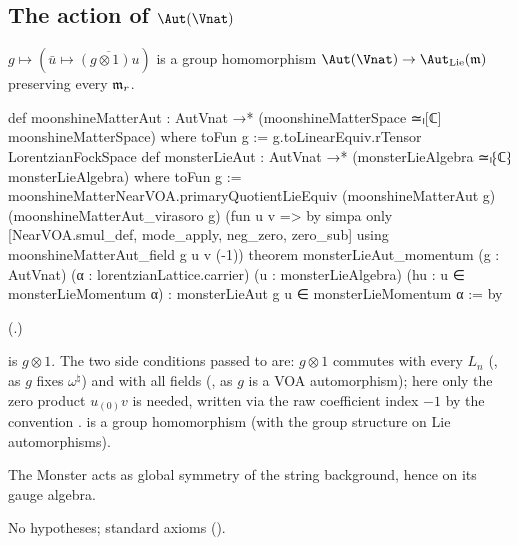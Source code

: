 \subsection{\texorpdfstring{The action of $\Aut(\Vnat)$}{The action of Aut(V-natural)}}

\begin{theorem}\label{ch18:thm:autaction}
$g\mapsto(\bar u\mapsto\overline{(g\otimes1)u})$ is a group homomorphism $\Aut(\Vnat)\to\Aut_{\mathrm{Lie}}(\chXVIIIm)$ preserving
every $\mathfrak{m}_r$.
\end{theorem}
\begin{leancode}
def moonshineMatterAut : AutVnat →* (moonshineMatterSpace ≃ₗ[ℂ] moonshineMatterSpace) where
  toFun g := g.toLinearEquiv.rTensor LorentzianFockSpace
def monsterLieAut : AutVnat →* (monsterLieAlgebra ≃ₗ⁅ℂ⁆ monsterLieAlgebra) where
  toFun g := moonshineMatterNearVOA.primaryQuotientLieEquiv (moonshineMatterAut g)
    (moonshineMatterAut_virasoro g) (fun u v => by
      simpa only [NearVOA.smul_def, mode_apply, neg_zero, zero_sub]
        using moonshineMatterAut_field g u v (-1))
theorem monsterLieAut_momentum (g : AutVnat) (α : lorentzianLattice.carrier)
    (u : monsterLieAlgebra) (hu : u ∈ monsterLieMomentum α) :
    monsterLieAut g u ∈ monsterLieMomentum α := by
\end{leancode}
(.)
\begin{dictionary}
 is $g\otimes1$.  The two side conditions passed to
 are: $g\otimes1$ commutes with every $L_n$ (, as $g$
fixes $\omega^\natural$) and with all fields (, as $g$ is a VOA automorphism); here only the
zero product $u_{(0)}v$ is needed, written via the raw coefficient index $-1$ by the convention
.   is a group homomorphism (with the group structure
 on Lie automorphisms).
\end{dictionary}
\begin{physics}The Monster acts as global symmetry of the string background, hence on its gauge algebra.\end{physics}
\begin{status}No hypotheses; standard axioms ().\end{status}

